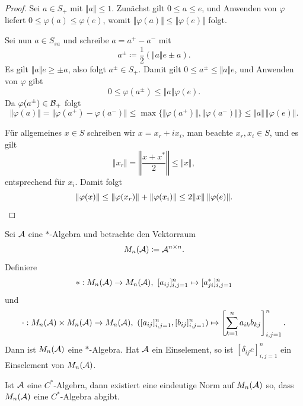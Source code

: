 \begin{proof}
    Sei $a \in S_+$ mit $\Vert a \Vert \leq 1$. Zunächst gilt $0 \leq a \leq e$, und Anwenden von $\varphi$ liefert $0 \leq \varphi(a) \leq \varphi(e)$, womit $\Vert \varphi(a) \Vert \leq \Vert \varphi(e) \Vert$ folgt.

    Sei nun $a \in S_{sa}$ und schreibe $a = a^+ - a^-$ mit
    \[
        a^\pm \coloneqq \frac{1}{2} (\Vert a \Vert e \pm a).
    \]
    Es gilt $\Vert a \Vert e \geq \pm a$, also folgt $a^\pm \in S_+$. Damit gilt $0 \leq a^\pm \leq \Vert a \Vert e$, und Anwenden von $\varphi$ gibt
    \[
        0 \leq \varphi(a^\pm) \leq \Vert a \Vert \varphi(e).
    \]
    Da $\varphi(a^\pm) \in \mathcal{B}_+$ folgt
    \[
        \Vert \varphi(a) \Vert
        =
        \Vert \varphi(a^+) - \varphi(a^-) \Vert
        \leq
        \max \{ \Vert \varphi(a^+) \Vert, \Vert \varphi(a^-) \Vert \}
        \leq
        \Vert a \Vert \, \Vert \varphi(e) \Vert.
    \]

    Für allgemeines $x \in S$ schreiben wir $x = x_r + ix_i$, man beachte $x_r, x_i \in S$, und es gilt
    \[
        \Vert x_r \Vert
        =
        \left\Vert \frac{x + x^*}{2} \right\Vert
        \leq
        \Vert x \Vert,
    \]
    entsprechend für $x_i$. Damit folgt
    \[
        \Vert \varphi(x) \Vert
        \leq
        \Vert \varphi(x_r) \Vert + \Vert \varphi(x_i) \Vert
        \leq
        2 \Vert x \Vert \, \Vert \varphi(e) \Vert. \qedhere
    \]
\end{proof}

\begin{lemma}
    Sei $\mathcal{A}$ eine $\ast$-Algebra und betrachte den Vektorraum
    \[
        M_n(\mathcal{A}) \coloneqq \mathcal{A}^{n \times n}.
    \]
    Definiere
    \[
        \ast : M_n(\Aa) \to M_n(\Aa), \ [a_{ij}]_{i,j=1}^n \mapsto [a_{ji}^*]_{i,j=1}^n
    \]
    und
    \[
        \cdot : M_n(\Aa) \times M_n(\Aa) \to M_n(\Aa), \ ([a_{ij}]_{i,j=1}^n, [b_{ij}]_{i,j=1}^n) \mapsto \left[ \sum_{k=1}^n a_{ik} b_{kj} \right]_{i,j=1}^n.
    \]
    Dann ist $M_n(\mathcal{A})$ eine $\ast$-Algebra. Hat $\mathcal{A}$ ein Einselement, so ist $[\delta_{ij} e]_{i,j=1}^n$ ein Einselement von $M_n(\mathcal{A})$.
\end{lemma}

\begin{proposition}
    Ist $\mathcal{A}$ eine $C^*$-Algebra, dann existiert eine eindeutige Norm auf $M_n(\mathcal{A})$ so, dass $M_n(\mathcal{A})$ eine $C^*$-Algebra abgibt.
\end{proposition}

